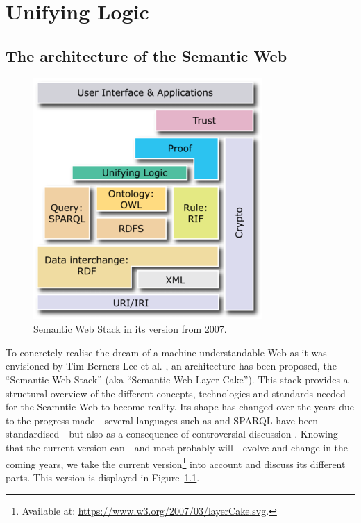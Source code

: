 \chapter{Unifying Logic} \label{uni}



\section{The architecture of the Semantic Web}
\begin{figure}[h!]
	\centering
	\includegraphics{Semantic_Web_Stack}
	\caption{Semantic Web Stack in its version from 2007.}
	\label{fig:stack}
\end{figure}

To concretely realise the dream of a machine understandable Web as it was envisioned by Tim Berners-Lee et al. \cite{SemanticWeb}, 
an architecture has been proposed, the  
 ``Semantic Web Stack'' (aka ``Semantic Web Layer Cake'').
This stack provides a structural overview of the different concepts, technologies and standards needed for the Seamntic Web to become reality. 
Its shape has changed over the years \cite{Gerber2} due to the progress made---several languages such as \rdf \cite{rdf} and SPARQL \cite{sparql} have been standardised---but also 
as a consequence of controversial discussion \cite{twotowers,rearch}. 
Knowing that the current version can---and most probably will---evolve and change in the coming years, we take the current 
version\footnote{Available at: \url{https://www.w3.org/2007/03/layerCake.svg}.} 
into account and discuss its different parts. This version is displayed in Figure~\ref{fig:stack}.


